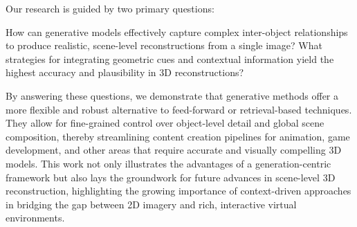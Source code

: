 Our research is guided by two primary questions:

How can generative models effectively capture complex inter-object relationships to produce realistic, scene-level reconstructions from a single image?
What strategies for integrating geometric cues and contextual information yield the highest accuracy and plausibility in 3D reconstructions?

By answering these questions, we demonstrate that generative methods offer a more flexible and robust alternative to feed-forward or retrieval-based techniques. They allow for fine-grained control over object-level detail and global scene composition, thereby streamlining content creation pipelines for animation, game development, and other areas that require accurate and visually compelling 3D models. This work not only illustrates the advantages of a generation-centric framework but also lays the groundwork for future advances in scene-level 3D reconstruction, highlighting the growing importance of context-driven approaches in bridging the gap between 2D imagery and rich, interactive virtual environments.


%
%
%


